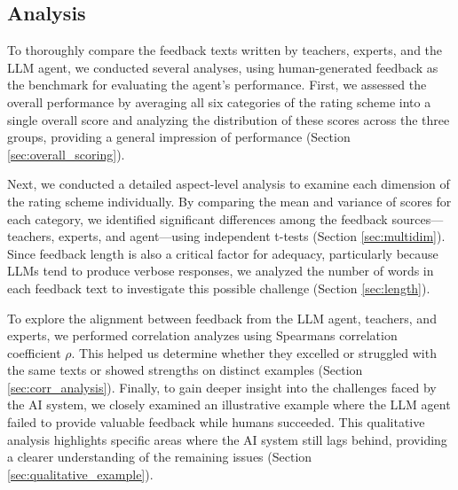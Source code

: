 
\subsection{Analysis}

To thoroughly compare the feedback texts written by teachers, experts, and the LLM agent, we conducted several analyses, using human-generated feedback as the benchmark for evaluating the agent's performance. First, we assessed the overall performance by averaging all six categories of the rating scheme into a single overall score and analyzing the distribution of these scores across the three groups, providing a general impression of performance (Section \ref{sec:overall_scoring}).

Next, we conducted a detailed aspect-level analysis to examine each dimension of the rating scheme individually. By comparing the mean and variance of scores for each category, we identified significant differences among the feedback sources—teachers, experts, and agent—using independent t-tests (Section \ref{sec:multidim}).
Since feedback length is also a critical factor for adequacy, particularly because LLMs tend to produce verbose responses, we analyzed the number of words in each feedback text to investigate this possible challenge (Section \ref{sec:length}).

To explore the alignment between feedback from the LLM agent, teachers, and experts, we performed correlation analyzes using Spearmans correlation coefficient $\rho$. This helped us determine whether they excelled or struggled with the same texts or showed strengths on distinct examples (Section \ref{sec:corr_analysis}).
Finally, to gain deeper insight into the challenges faced by the AI system, we closely examined an illustrative example where the LLM agent failed to provide valuable feedback while humans succeeded. This qualitative analysis highlights specific areas where the AI system still lags behind, providing a clearer understanding of the remaining issues (Section \ref{sec:qualitative_example}).

